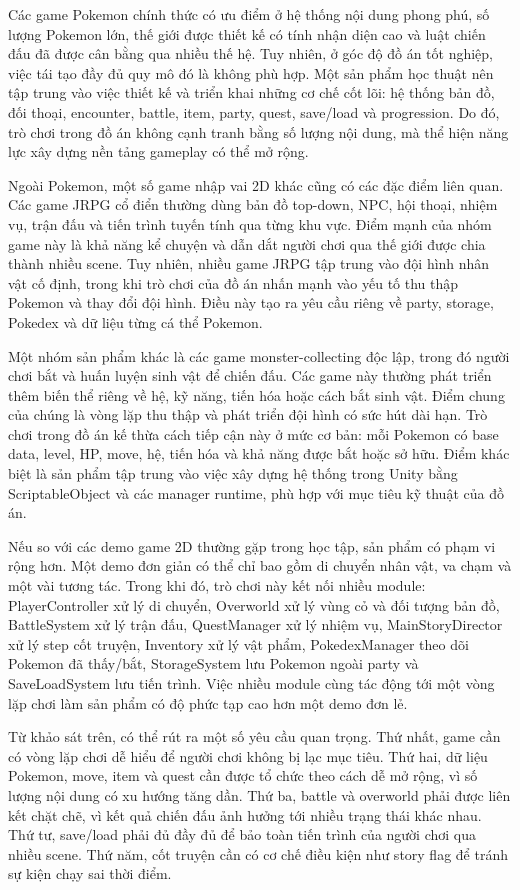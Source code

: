 Các game Pokemon chính thức có ưu điểm ở hệ thống nội dung phong phú, số lượng Pokemon lớn, thế giới được thiết kế có tính nhận diện cao và luật chiến đấu đã được cân bằng qua nhiều thế hệ. Tuy nhiên, ở góc độ đồ án tốt nghiệp, việc tái tạo đầy đủ quy mô đó là không phù hợp. Một sản phẩm học thuật nên tập trung vào việc thiết kế và triển khai những cơ chế cốt lõi: hệ thống bản đồ, đối thoại, encounter, battle, item, party, quest, save/load và progression. Do đó, trò chơi trong đồ án không cạnh tranh bằng số lượng nội dung, mà thể hiện năng lực xây dựng nền tảng gameplay có thể mở rộng.

Ngoài Pokemon, một số game nhập vai 2D khác cũng có các đặc điểm liên quan. Các game JRPG cổ điển thường dùng bản đồ top-down, NPC, hội thoại, nhiệm vụ, trận đấu và tiến trình tuyến tính qua từng khu vực. Điểm mạnh của nhóm game này là khả năng kể chuyện và dẫn dắt người chơi qua thế giới được chia thành nhiều scene. Tuy nhiên, nhiều game JRPG tập trung vào đội hình nhân vật cố định, trong khi trò chơi của đồ án nhấn mạnh vào yếu tố thu thập Pokemon và thay đổi đội hình. Điều này tạo ra yêu cầu riêng về party, storage, Pokedex và dữ liệu từng cá thể Pokemon.

Một nhóm sản phẩm khác là các game monster-collecting độc lập, trong đó người chơi bắt và huấn luyện sinh vật để chiến đấu. Các game này thường phát triển thêm biến thể riêng về hệ, kỹ năng, tiến hóa hoặc cách bắt sinh vật. Điểm chung của chúng là vòng lặp thu thập và phát triển đội hình có sức hút dài hạn. Trò chơi trong đồ án kế thừa cách tiếp cận này ở mức cơ bản: mỗi Pokemon có base data, level, HP, move, hệ, tiến hóa và khả năng được bắt hoặc sở hữu. Điểm khác biệt là sản phẩm tập trung vào việc xây dựng hệ thống trong Unity bằng ScriptableObject và các manager runtime, phù hợp với mục tiêu kỹ thuật của đồ án.

Nếu so với các demo game 2D thường gặp trong học tập, sản phẩm có phạm vi rộng hơn. Một demo đơn giản có thể chỉ bao gồm di chuyển nhân vật, va chạm và một vài tương tác. Trong khi đó, trò chơi này kết nối nhiều module: PlayerController xử lý di chuyển, Overworld xử lý vùng cỏ và đối tượng bản đồ, BattleSystem xử lý trận đấu, QuestManager xử lý nhiệm vụ, MainStoryDirector xử lý step cốt truyện, Inventory xử lý vật phẩm, PokedexManager theo dõi Pokemon đã thấy/bắt, StorageSystem lưu Pokemon ngoài party và SaveLoadSystem lưu tiến trình. Việc nhiều module cùng tác động tới một vòng lặp chơi làm sản phẩm có độ phức tạp cao hơn một demo đơn lẻ.

Từ khảo sát trên, có thể rút ra một số yêu cầu quan trọng. Thứ nhất, game cần có vòng lặp chơi dễ hiểu để người chơi không bị lạc mục tiêu. Thứ hai, dữ liệu Pokemon, move, item và quest cần được tổ chức theo cách dễ mở rộng, vì số lượng nội dung có xu hướng tăng dần. Thứ ba, battle và overworld phải được liên kết chặt chẽ, vì kết quả chiến đấu ảnh hưởng tới nhiều trạng thái khác nhau. Thứ tư, save/load phải đủ đầy đủ để bảo toàn tiến trình của người chơi qua nhiều scene. Thứ năm, cốt truyện cần có cơ chế điều kiện như story flag để tránh sự kiện chạy sai thời điểm.

